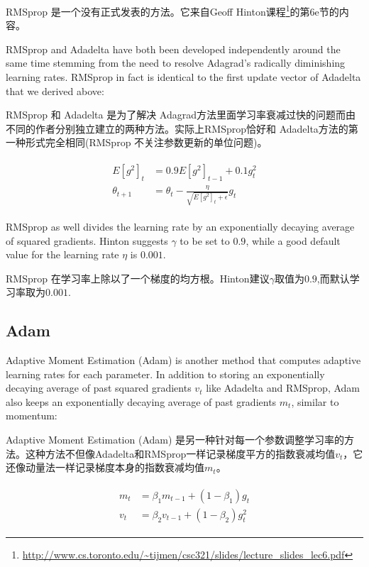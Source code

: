 \documentclass{article}
\begin{document}
RMSprop 是一个没有正式发表的方法。它来自Geoff Hinton课程\footnote{\url{http://www.cs.toronto.edu/~tijmen/csc321/slides/lecture_slides_lec6.pdf}}的第6e节的内容。

RMSprop and Adadelta have both been developed independently around the same time stemming from the need to resolve Adagrad's radically diminishing learning rates. RMSprop in fact is identical to the first update vector of Adadelta that we derived above:

RMSprop 和 Adadelta 是为了解决 Adagrad方法里面学习率衰减过快的问题而由不同的作者分别独立建立的两种方法。实际上RMSprop恰好和 Adadelta方法的第一种形式完全相同(RMSprop 不关注参数更新的单位问题)。

\begin{align}
\begin{split}
E[g^2]_t &= 0.9 E[g^2]_{t-1} + 0.1 g^2_t\\
\theta_{t+1} &= \theta_{t} - \frac{\eta}{\sqrt{E[g^2]_t + \epsilon}} g_{t}
\end{split}
\end{align}

RMSprop as well divides the learning rate by an exponentially decaying average of squared gradients. Hinton suggests $\gamma$ to be set to $0.9$, while a good default value for the learning rate $\eta$ is $0.001$.

RMSprop 在学习率上除以了一个梯度的均方根。Hinton建议$\gamma$取值为$0.9$,而默认学习率取为$0.001$.

\subsection{Adam}

Adaptive Moment Estimation (Adam) \cite{Kingma2015} is another method that computes adaptive learning rates for each parameter. In addition to storing an exponentially decaying average of past squared gradients $v_t$ like Adadelta and RMSprop, Adam also keeps an exponentially decaying average of past gradients $m_t$, similar to momentum:

Adaptive Moment Estimation (Adam) \cite{Kingma2015} 是另一种针对每一个参数调整学习率的方法。这种方法不但像Adadelta和RMSprop一样记录梯度平方的指数衰减均值$v_t$，它还像动量法一样记录梯度本身的指数衰减均值$m_t$。

\begin{align}
\begin{split}
m_t &= \beta_1 m_{t-1} + (1 - \beta_1) g_t\\
v_t &= \beta_2 v_{t-1} + (1 - \beta_2) g_t^2
\end{split}
\end{align}
\end{document}
